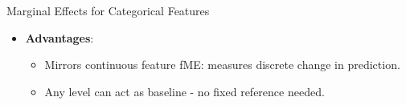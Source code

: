 \documentclass[11pt,compress,t,notes=noshow, aspectratio=169, xcolor=table]{beamer}
\begin{document}
\begin{frame}{Marginal Effects for Categorical Features}
\begin{itemize}
\item \textbf{Advantages}:
\begin{itemize}
\item Mirrors continuous feature fME: measures discrete change in prediction.
\item Any level can act as baseline - no fixed reference needed.
\end{itemize}
\end{itemize}
\end{frame}





\end{document}
